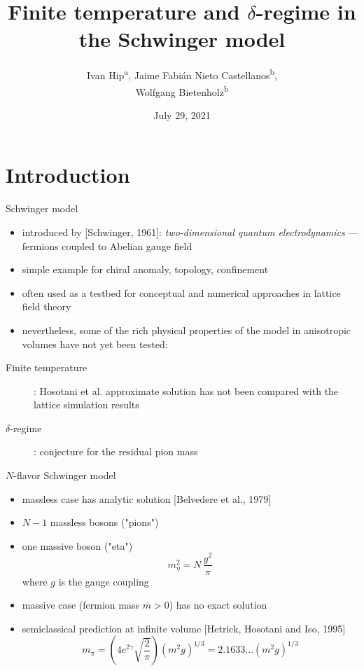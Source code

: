 \documentclass[english]{beamer}
\title{Finite temperature and $\delta$-regime in the Schwinger model}
\author{
  Ivan Hip\textsuperscript{a},
  Jaime Fabián Nieto Castellanos\textsuperscript{b},\\
  Wolfgang Bietenholz\textsuperscript{b}}
\institute{
  \textsuperscript{a}University of Zagreb, Croatia\\
  \textsuperscript{b}UNAM, Mexico
}
\date{July 29, 2021}
\begin{document}
 
\begin{frame}
  \titlepage
\end{frame}


\section{Introduction}

\begin{frame}{Schwinger model}
  \begin{itemize}
    \item introduced by [Schwinger, 1961]:
      \textit{two-dimensional quantum electrodynamics}
      --- fermions coupled to Abelian gauge field 
    \item simple example for chiral anomaly, topology, confinement
    \item often used as a testbed for conceptual and numerical
      approaches in lattice field theory
    \item nevertheless, some of the rich physical properties of
      the model in anisotropic volumes have not yet been tested:
  \end{itemize}
  \begin{description}
    \item[Finite temperature]:
      Hosotani et al. approximate solution has not been compared with the lattice
      simulation results
    \item[$\delta$-regime]: conjecture for the residual pion mass
  \end{description}
\end{frame}

\begin{frame}{$N$-flavor Schwinger model}
  \begin{itemize}
    \item massless case has analytic solution
      [Belvedere et al., 1979]
    \item $N - 1$ massless bosons ("pions")
    \item one massive boson ("eta")
      \[
        m_\eta^2 = N\,\frac{g^2}{\pi}
      \]
      where $g$ is the gauge coupling
    \item massive case (fermion mass $m > 0$) has no exact solution
    \item semiclassical prediction at infinite volume [Hetrick, Hosotani and Iso, 1995]
      \[
        m_\pi = \left(4e^{2\gamma}\sqrt{\frac{2}{\pi}}\right)
          (m^2 g)^{1/3} = 2.1633...(m^2 g)^{1/3}
      \]        
  \end{itemize}
\end{frame}
\end{document}
